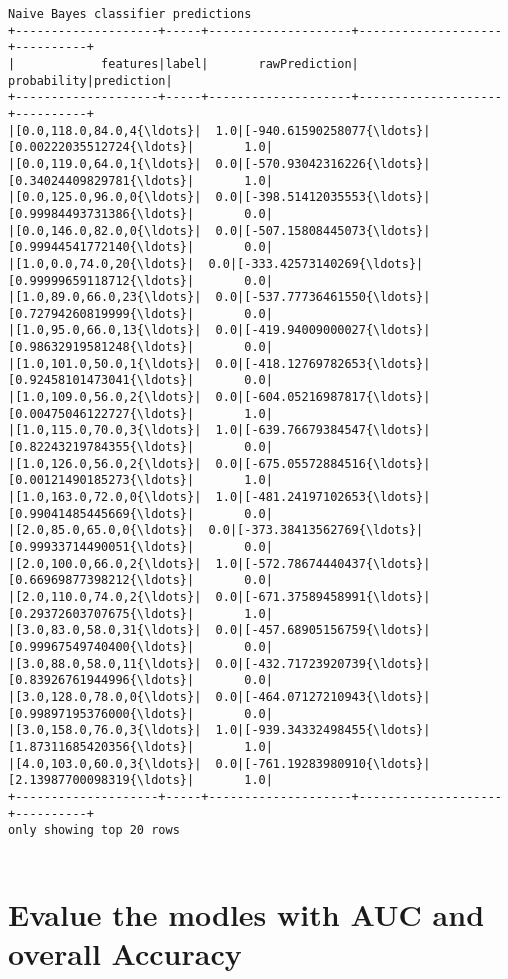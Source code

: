 \documentclass{report}
\begin{document}
\begin{Verbatim}[commandchars=\\\{\}]
Naive Bayes classifier predictions
+--------------------+-----+--------------------+--------------------+----------+
|            features|label|       rawPrediction|         probability|prediction|
+--------------------+-----+--------------------+--------------------+----------+
|[0.0,118.0,84.0,4{\ldots}|  1.0|[-940.61590258077{\ldots}|[0.00222035512724{\ldots}|       1.0|
|[0.0,119.0,64.0,1{\ldots}|  0.0|[-570.93042316226{\ldots}|[0.34024409829781{\ldots}|       1.0|
|[0.0,125.0,96.0,0{\ldots}|  0.0|[-398.51412035553{\ldots}|[0.99984493731386{\ldots}|       0.0|
|[0.0,146.0,82.0,0{\ldots}|  0.0|[-507.15808445073{\ldots}|[0.99944541772140{\ldots}|       0.0|
|[1.0,0.0,74.0,20{\ldots}|  0.0|[-333.42573140269{\ldots}|[0.99999659118712{\ldots}|       0.0|
|[1.0,89.0,66.0,23{\ldots}|  0.0|[-537.77736461550{\ldots}|[0.72794260819999{\ldots}|       0.0|
|[1.0,95.0,66.0,13{\ldots}|  0.0|[-419.94009000027{\ldots}|[0.98632919581248{\ldots}|       0.0|
|[1.0,101.0,50.0,1{\ldots}|  0.0|[-418.12769782653{\ldots}|[0.92458101473041{\ldots}|       0.0|
|[1.0,109.0,56.0,2{\ldots}|  0.0|[-604.05216987817{\ldots}|[0.00475046122727{\ldots}|       1.0|
|[1.0,115.0,70.0,3{\ldots}|  1.0|[-639.76679384547{\ldots}|[0.82243219784355{\ldots}|       0.0|
|[1.0,126.0,56.0,2{\ldots}|  0.0|[-675.05572884516{\ldots}|[0.00121490185273{\ldots}|       1.0|
|[1.0,163.0,72.0,0{\ldots}|  1.0|[-481.24197102653{\ldots}|[0.99041485445669{\ldots}|       0.0|
|[2.0,85.0,65.0,0{\ldots}|  0.0|[-373.38413562769{\ldots}|[0.99933714490051{\ldots}|       0.0|
|[2.0,100.0,66.0,2{\ldots}|  1.0|[-572.78674440437{\ldots}|[0.66969877398212{\ldots}|       0.0|
|[2.0,110.0,74.0,2{\ldots}|  0.0|[-671.37589458991{\ldots}|[0.29372603707675{\ldots}|       1.0|
|[3.0,83.0,58.0,31{\ldots}|  0.0|[-457.68905156759{\ldots}|[0.99967549740400{\ldots}|       0.0|
|[3.0,88.0,58.0,11{\ldots}|  0.0|[-432.71723920739{\ldots}|[0.83926761944996{\ldots}|       0.0|
|[3.0,128.0,78.0,0{\ldots}|  0.0|[-464.07127210943{\ldots}|[0.99897195376000{\ldots}|       0.0|
|[3.0,158.0,76.0,3{\ldots}|  1.0|[-939.34332498455{\ldots}|[1.87311685420356{\ldots}|       1.0|
|[4.0,103.0,60.0,3{\ldots}|  0.0|[-761.19283980910{\ldots}|[2.13987700098319{\ldots}|       1.0|
+--------------------+-----+--------------------+--------------------+----------+
only showing top 20 rows


    \end{Verbatim}

\section{Evalue the modles with AUC and overall
Accuracy}\label{evalue-the-modles-with-auc-and-overall-accuracy}
\end{document}
